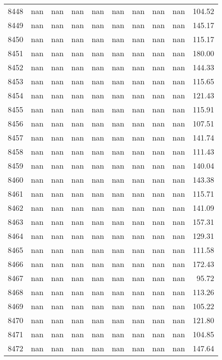 \begin{tabular}{lrrrrrrrrr}
8448 & nan & nan & nan & nan & nan & nan & nan & nan & 104.52 \\
8449 & nan & nan & nan & nan & nan & nan & nan & nan & 145.17 \\
8450 & nan & nan & nan & nan & nan & nan & nan & nan & 115.17 \\
8451 & nan & nan & nan & nan & nan & nan & nan & nan & 180.00 \\
8452 & nan & nan & nan & nan & nan & nan & nan & nan & 144.33 \\
8453 & nan & nan & nan & nan & nan & nan & nan & nan & 115.65 \\
8454 & nan & nan & nan & nan & nan & nan & nan & nan & 121.43 \\
8455 & nan & nan & nan & nan & nan & nan & nan & nan & 115.91 \\
8456 & nan & nan & nan & nan & nan & nan & nan & nan & 107.51 \\
8457 & nan & nan & nan & nan & nan & nan & nan & nan & 141.74 \\
8458 & nan & nan & nan & nan & nan & nan & nan & nan & 111.43 \\
8459 & nan & nan & nan & nan & nan & nan & nan & nan & 140.04 \\
8460 & nan & nan & nan & nan & nan & nan & nan & nan & 143.38 \\
8461 & nan & nan & nan & nan & nan & nan & nan & nan & 115.71 \\
8462 & nan & nan & nan & nan & nan & nan & nan & nan & 141.09 \\
8463 & nan & nan & nan & nan & nan & nan & nan & nan & 157.31 \\
8464 & nan & nan & nan & nan & nan & nan & nan & nan & 129.31 \\
8465 & nan & nan & nan & nan & nan & nan & nan & nan & 111.58 \\
8466 & nan & nan & nan & nan & nan & nan & nan & nan & 172.43 \\
8467 & nan & nan & nan & nan & nan & nan & nan & nan & 95.72 \\
8468 & nan & nan & nan & nan & nan & nan & nan & nan & 113.26 \\
8469 & nan & nan & nan & nan & nan & nan & nan & nan & 105.22 \\
8470 & nan & nan & nan & nan & nan & nan & nan & nan & 121.80 \\
8471 & nan & nan & nan & nan & nan & nan & nan & nan & 104.85 \\
8472 & nan & nan & nan & nan & nan & nan & nan & nan & 147.64 \\

\end{tabular}
